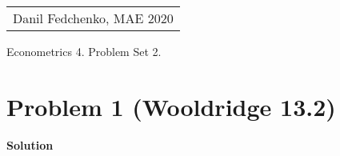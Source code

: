 \documentclass[a4paper]{article}
\begin{document}
	\begin{flushright}
		\begin{tabular}{r}
			Danil Fedchenko, MAE 2020\\
		\end{tabular}
	\end{flushright}
	
	
	\begin{center}
		Econometrics 4. Problem Set 2.
	\end{center}
\section*{Problem 1 (Wooldridge 13.2)}





\textbf{Solution}
\end{document}
